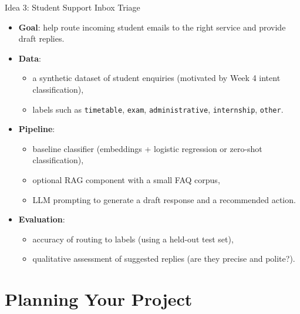 \documentclass[aspectratio=169]{beamer}
\begin{document}
\begin{frame}{Idea 3: Student Support Inbox Triage}
  \begin{itemize}
    \item \textbf{Goal}: help route incoming student emails to the right service and provide draft replies.
    \item \textbf{Data}:
      \begin{itemize}
        \item a synthetic dataset of student enquiries (motivated by Week 4 intent classification),
        \item labels such as \texttt{timetable}, \texttt{exam}, \texttt{administrative}, \texttt{internship}, \texttt{other}.
      \end{itemize}
    \item \textbf{Pipeline}:
      \begin{itemize}
        \item baseline classifier (embeddings + logistic regression or zero-shot classification),
        \item optional RAG component with a small FAQ corpus,
        \item LLM prompting to generate a draft response and a recommended action.
      \end{itemize}
    \item \textbf{Evaluation}:
      \begin{itemize}
        \item accuracy of routing to labels (using a held-out test set),
        \item qualitative assessment of suggested replies (are they precise and polite?).
      \end{itemize}
  \end{itemize}
\end{frame}

\section{Planning Your Project}
\end{document}
